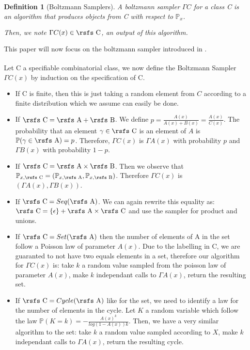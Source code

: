 \documentclass{article}
\newtheorem{definition}{Definition}
\begin{document}
\begin{definition}[Boltzmann Samplers]
A boltzmann sampler $\Gamma C$ for a class {\rsfs C} is an algorithm that produces objects from {\rsfs C} with respect to $\mathbb{P}_x$.

Then, we note $\Gamma C(x) \in \text{\rsfs C}$, an output of this algorithm. 
\end{definition}

This paper will now focus on the boltzmann sampler introduced in \cite{BS}.
\\\\
Let {\rsfs C} a specifiable combinatorial class, we now define the Boltzmann Sampler $\Gamma C(x)$ by induction on the specification of {\rsfs C}.

\begin{itemize}
\item If {\rsfs C} is finite, then this is just taking a random element from $C$ according to a finite distribution which we assume can easily be done.

\item If $\text{\rsfs C} = \text{\rsfs A} + \text{\rsfs B}$. We define $p = \frac{A(x)}{A(x) + B(x)} = \frac{A(x)}{C(x)}$. The probability that an element $\gamma \in \text{\rsfs  C}$ is an element of $A$ is $\mathbb{P}(\gamma \in \text{\rsfs A}) = p$. Therefore, $\Gamma C(x)$ is $\Gamma A(x)$ with probability $p$ and $\Gamma B(x)$ with probability $1-p$.

\item If $\text{\rsfs C} = \text{\rsfs A} \times \text{\rsfs B}$. Then we observe that $\mathbb{P}_{x,\text{\rsfs C}} = (\mathbb{P}_{x,\text{\rsfs A}},\mathbb{P}_{x,\text{\rsfs B}})$. Therefore $\Gamma C(x)$ is $(\Gamma A(x),\Gamma B(x))$.

\item If $\text{\rsfs C} = Seq(\text{\rsfs A})$. We can again rewrite this equality as: $\text{\rsfs C} = \{\epsilon\} + \text{\rsfs A} \times \text{\rsfs C}$ and use the sampler for product and unions.

\item If $\text{\rsfs C} = Set(\text{\rsfs A})$ then the number of elements of {\rsfs A} in the set follow a Poisson law of parameter $A(x)$. Due to the labelling in {\rsfs C}, we are guaranted to not have two equals elements in a set, therefore our algorithm for $\Gamma C(x)$ is: take $k$ a random value sampled from the poisson law of parameter $A(x)$, make $k$ independant calls to $\Gamma A(x)$, return the resulting set.

\item If $\text{\rsfs C} = Cycle(\text{\rsfs A})$ like for the set, we need to identify a law for the number of elements in the cycle. Let $K$ a random variable which follow the law $\mathbb P(K = k) = -\frac{{A(x)}^k}{log(1-A(x))k}$. Then, we have a very similar algorithm to the set: take $k$ a random value sampled according to $X$, make $k$ independant calls to $\Gamma A(x)$, return the resulting cycle.
\end{itemize}
\end{document}
